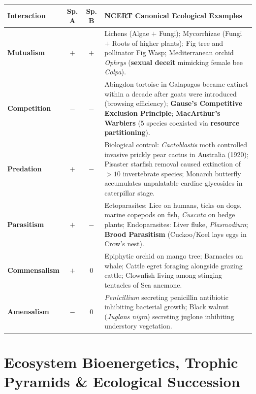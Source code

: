 \documentclass[10pt,twoside,openright]{book}
\begin{document}
\begin{conceptbox}
\footnotesize
\setlength{\tabcolsep}{3pt}
\renewcommand{\arraystretch}{1.12}
\begin{tabularx}{\linewidth}{|l|c|c|X|}
\hline
\textbf{Interaction} & \textbf{Sp. A} & \textbf{Sp. B} & \textbf{NCERT Canonical Ecological Examples} \\
\hline
\textbf{Mutualism} & $+$ & $+$ & Lichens (Algae $+$ Fungi); Mycorrhizae (Fungi $+$ Roots of higher plants); Fig tree and pollinator Fig Wasp; Mediterranean orchid \textit{Ophrys} (\textbf{sexual deceit} mimicking female bee \textit{Colpa}). \\
\hline
\textbf{Competition} & $-$ & $-$ & Abingdon tortoise in Galapagos became extinct within a decade after goats were introduced (browsing efficiency); \textbf{Gause's Competitive Exclusion Principle}; \textbf{MacArthur's Warblers} (5 species coexisted via \textbf{resource partitioning}). \\
\hline
\textbf{Predation} & $+$ & $-$ & Biological control: \textit{Cactoblastis} moth controlled invasive prickly pear cactus in Australia (1920); Pisaster starfish removal caused extinction of $>10$ invertebrate species; Monarch butterfly accumulates unpalatable cardiac glycosides in caterpillar stage. \\
\hline
\textbf{Parasitism} & $+$ & $-$ & Ectoparasites: Lice on humans, ticks on dogs, marine copepods on fish, \textit{Cuscuta} on hedge plants; Endoparasites: Liver fluke, \textit{Plasmodium}; \textbf{Brood Parasitism} (Cuckoo/Koel lays eggs in Crow's nest). \\
\hline
\textbf{Commensalism} & $+$ & $0$ & Epiphytic orchid on mango tree; Barnacles on whale; Cattle egret foraging alongside grazing cattle; Clownfish living among stinging tentacles of Sea anemone. \\
\hline
\textbf{Amensalism} & $-$ & $0$ & \textit{Penicillium} secreting penicillin antibiotic inhibiting bacterial growth; Black walnut (\textit{Juglans nigra}) secreting juglone inhibiting understory vegetation. \\
\hline
\end{tabularx}
\end{conceptbox}

\section{Ecosystem Bioenergetics, Trophic Pyramids \& Ecological Succession}
\end{document}
